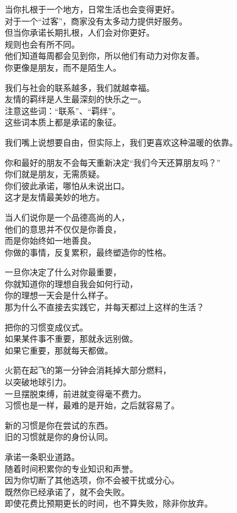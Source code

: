 \documentclass[
]{article}
\begin{document}
当你扎根于一个地方，日常生活也会变得更好。\\
对于一个``过客''，商家没有太多动力提供好服务。\\
但当你承诺长期扎根，人们会对你更好。\\
规则也会有所不同。\\
他们知道每周都会见到你，所以他们有动力对你友善。\\
你更像是朋友，而不是陌生人。

我们与社会的联系越多，我们就越幸福。\\
友情的羁绊是人生最深刻的快乐之一。\\
注意这些词：``联系''、``羁绊''。\\
这些词本质上都是承诺的象征。

我们嘴上说想要自由，但实际上，我们更喜欢这种温暖的依靠。

你和最好的朋友不会每天重新决定``我们今天还算朋友吗？''\\
你们就是朋友，无需质疑。\\
你们彼此承诺，哪怕从未说出口。\\
这才是友情最美妙的地方。

当人们说你是一个品德高尚的人，\\
他们的意思并不仅仅是你善良，\\
而是你始终如一地善良。\\
你做的事情，反复累积，最终塑造你的性格。

一旦你决定了什么对你最重要，\\
你就知道你的理想自我会如何行动，\\
你的理想一天会是什么样子。\\
那为什么不直接去实践它，并每天都过上这样的生活？

把你的习惯变成仪式。\\
如果某件事不重要，那就永远别做。\\
如果它重要，那就每天都做。

火箭在起飞的第一分钟会消耗掉大部分燃料，\\
以突破地球引力。\\
一旦摆脱束缚，前进就变得毫不费力。\\
习惯也是一样，最难的是开始，之后就容易了。

新的习惯是你在尝试的东西。\\
旧的习惯就是你的身份认同。

承诺一条职业道路。\\
随着时间积累你的专业知识和声誉。\\
因为你切断了其他选项，你不会被干扰或分心。\\
既然你已经承诺了，就不会失败。\\
即使花费比预期更长的时间，也不算失败，除非你放弃。
\end{document}
